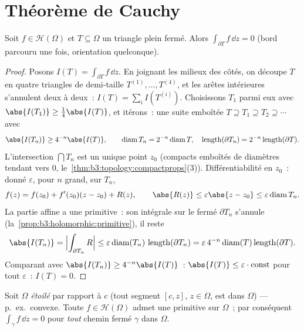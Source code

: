 \section{Théorème de Cauchy}

\begin{theorem}[Goursat]\label{thm:b3:holomorphic:goursat}
Soit $f \in \mathcal H(\Omega)$ et $T \subseteq \Omega$ un
triangle plein fermé. Alors $\int_{\partial T}f\,\dd z = 0$
(bord parcouru une fois, orientation quelconque).
\end{theorem}

\begin{proof}
Posons $I(T) = \int_{\partial T}f\,\dd z$. En joignant les
milieux des côtés, on découpe $T$ en quatre triangles de
demi-taille $T^{(1)}, \dots, T^{(4)}$, et les arêtes intérieures
s'annulent deux à deux~: $I(T) = \sum_iI(T^{(i)})$. Choisissons
$T_1$ parmi eux avec $\abs{I(T_1)} \geq \frac14\abs{I(T)}$, et
itérons~: une suite emboîtée $T \supseteq T_1 \supseteq T_2
\supseteq\cdots$ avec
\[
\abs{I(T_n)} \geq 4^{-n}\abs{I(T)},
\qquad
\operatorname{diam}T_n = 2^{-n}\operatorname{diam}T,
\quad
\operatorname{length}(\partial T_n) =
2^{-n}\operatorname{length}(\partial T).
\]
L'intersection $\bigcap T_n$ est un unique point $z_0$
(compacts emboîtés de diamètres tendant vers $0$,
le~\cref{thm:b3:topology:compactprops}(3)). Différentiabilité
en $z_0$~: donné $\varepsilon$, pour $n$ grand, sur $T_n$,
\[
f(z) = f(z_0) + f'(z_0)(z - z_0) + R(z),
\qquad \abs{R(z)} \leq \varepsilon\abs{z - z_0} \leq
\varepsilon\operatorname{diam}T_n .
\]
La partie affine a une primitive~: son intégrale sur le fermé
$\partial T_n$ s'annule (la~\cref{prop:b3:holomorphic:primitive}),
il reste
\[
\abs{I(T_n)} = \Bigl|\int_{\partial T_n}R\Bigr|
\leq \varepsilon\operatorname{diam}(T_n)\,
\operatorname{length}(\partial T_n)
= \varepsilon\,4^{-n}\operatorname{diam}(T)
\operatorname{length}(\partial T) .
\]
Comparant avec $\abs{I(T_n)} \geq 4^{-n}\abs{I(T)}$~:
$\abs{I(T)} \leq \varepsilon\cdot\text{const}$ pour tout
$\varepsilon$~: $I(T) = 0$.
\end{proof}

\begin{theorem}
\label{thm:b3:holomorphic:cauchy}
Soit $\Omega$ \emph{étoilé} par rapport à $c$ (tout segment
$[c, z]$, $z \in \Omega$, est  dans $\Omega$) --- p.\
ex.\ convexe. Toute $f \in \mathcal H(\Omega)$ admet une
primitive sur $\Omega$~; par conséquent $\int_\gamma f\,\dd z
= 0$ pour \emph{tout} chemin fermé $\gamma$ dans
$\Omega$.
\end{theorem}

